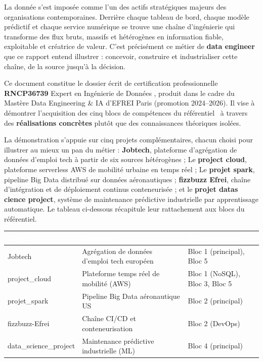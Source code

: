 \documentclass[11pt]{article}
\newcommand{\thead}[1]{\textbf{\textcolor{white}{#1}}}
\begin{document}
La donnée s'est imposée comme l'un des actifs stratégiques majeurs des organisations
contemporaines. Derrière chaque tableau de bord, chaque modèle prédictif et chaque
service numérique se trouve une chaîne d'ingénierie qui transforme des flux bruts,
massifs et hétérogènes en information fiable, exploitable et créatrice de valeur.
C'est précisément ce métier de \textbf{data engineer} que ce rapport entend illustrer 
: concevoir, construire et industrialiser cette chaîne, de la source jusqu'à la décision.

Ce document constitue le dossier écrit de certification professionnelle \textbf{RNCP36739}
\og{} Expert en Ingénierie de Données \fg{}, produit dans le cadre du Mastère Data Engineering \& IA 
d'EFREI Paris (promotion 2024--2026). Il vise à démontrer l'acquisition des cinq blocs de compétences 
du référentiel~\cite{rncp} à travers des \textbf{réalisations concrètes} plutôt que des connaissances 
théoriques isolées.

La démonstration s'appuie sur cinq projets complémentaires, chacun choisi pour
illustrer au mieux un pan du métier : \textbf{Jobtech}, plateforme d'agrégation de
données d'emploi tech à partir de six sources hétérogènes ; Le \textbf{project cloud},
plateforme serverless AWS de mobilité urbaine en temps réel ; Le \textbf{projet spark},
pipeline Big Data distribué sur données aéronautiques ; \textbf{fizzbuzz Efrei},
chaîne d'intégration et de déploiement continus conteneurisée ; et le
\textbf{projet datas cience project}, système de maintenance prédictive industrielle par
apprentissage automatique. Le tableau ci-dessous récapitule leur rattachement aux
blocs du référentiel.

\begin{center}
\begin{tabularx}{\linewidth}{|l|>{\raggedright\arraybackslash}X|l|}
\hline
\rowcolor{tableHeader}
\thead{Projet} & \thead{Domaine} & \thead{Blocs couverts} \\
\hline
Jobtech & Agrégation de données d'emploi tech européen & Bloc 1 (principal), Bloc 5 \\
\hline
project\_cloud & Plateforme temps réel de mobilité (AWS) & Bloc 1 (NoSQL), Bloc 3, Bloc 5 \\
\hline
projet\_spark & Pipeline Big Data aéronautique US & Bloc 2 (principal) \\
\hline
fizzbuzz-Efrei & Chaîne CI/CD et conteneurisation & Bloc 2 (DevOps) \\
\hline
data\_science\_project & Maintenance prédictive industrielle (ML) & Bloc 4 (principal) \\
\hline
\end{tabularx}
\end{center}
\end{document}

